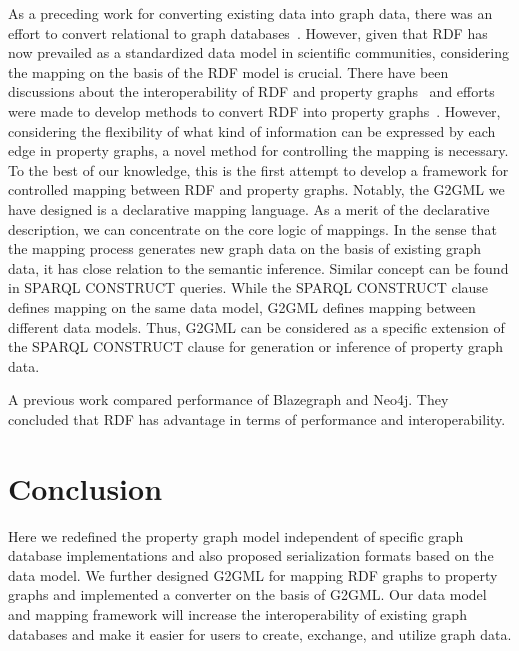 \documentclass[runningheads]{llncs}
\begin{document}
As a preceding work for converting existing data into graph data, there was an effort to convert relational to graph databases~\cite{virgilio1}. 
However, given that RDF has now prevailed as a standardized data model in scientific communities, considering the mapping on the basis of the RDF model is crucial. There have been discussions about the interoperability of RDF and property graphs~\cite{hartig,angles4,das,thakkar} and efforts were made to develop methods to convert RDF into property graphs~\cite{tomaszuk1,virgilio}. However, considering the flexibility of what kind of information can be expressed by each edge in property graphs, a novel method for controlling the mapping is necessary.
To the best of our knowledge, this is the first attempt to develop a framework for controlled mapping between RDF and property graphs. 
Notably, the G2GML we have designed is a declarative mapping language. 
As a merit of the declarative description, we can concentrate on the core logic of mappings. In the sense that the mapping process generates new graph data on the basis of existing graph data, it has close relation to the semantic inference. Similar concept can be found in SPARQL CONSTRUCT queries. While the SPARQL CONSTRUCT clause defines mapping on the same data model, G2GML defines mapping between different data models. 
Thus, G2GML can be considered as a specific extension of the SPARQL CONSTRUCT clause for generation or inference of property graph data.

A previous work compared performance of Blazegraph and Neo4j. They concluded that RDF has advantage in terms of performance and interoperability.

\section{Conclusion}
Here we redefined the property graph model independent of specific graph database implementations and also proposed serialization formats based on the data model.
We further designed G2GML for mapping RDF graphs to property graphs and implemented a converter on the basis of G2GML.
Our data model and mapping framework will increase the interoperability of existing graph databases and make it easier for users to create, exchange, and utilize graph data.
\end{document}
